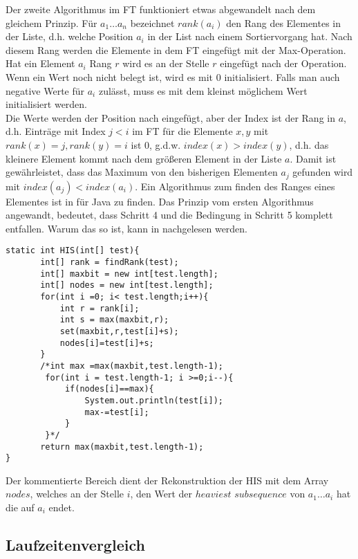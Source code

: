 Der zweite Algorithmus im FT funktioniert etwas abgewandelt nach dem gleichem Prinzip. Für $a_1\dots a_n$ bezeichnet $rank(a_i)$ den Rang des Elementes in der Liste, d.h. welche Position $a_i$ in der List nach einem Sortiervorgang hat. Nach diesem Rang werden die Elemente in dem FT eingefügt mit der Max-Operation. Hat ein Element $a_i$ Rang $r$ wird es an der Stelle $r$ eingefügt nach der Operation. Wenn ein Wert noch nicht belegt ist, wird es mit 0 initialisiert. Falls man auch negative Werte für $a_i$ zulässt, muss es mit dem kleinst möglichem Wert initialisiert werden. \\
Die Werte werden der Position nach eingefügt, aber der Index ist der Rang in $a$, d.h. Einträge mit Index $j<i$ im FT für die Elemente $x,y$ mit $rank(x)=j,rank(y)=i$ ist 0, g.d.w. $index(x)>index(y)$, d.h. das kleinere Element kommt nach dem größeren Element in der Liste $a$. Damit ist gewährleistet, dass das Maximum von den bisherigen Elementen $a_j$ gefunden wird mit $index(a_j)<index(a_i)$. Ein Algorithmus zum finden des Ranges eines Elementes ist in\cite{rank}  für Java zu finden. Das Prinzip vom ersten Algorithmus angewandt, bedeutet, dass Schritt 4 und die Bedingung in Schritt 5 komplett entfallen. Warum das so ist, kann in\cite{wordpress} nachgelesen werden.
\begin{lstlisting}
static int HIS(int[] test){
       int[] rank = findRank(test);
       int[] maxbit = new int[test.length];
       int[] nodes = new int[test.length];
       for(int i =0; i< test.length;i++){
           int r = rank[i];
           int s = max(maxbit,r);
           set(maxbit,r,test[i]+s);
           nodes[i]=test[i]+s;
       }
       /*int max =max(maxbit,test.length-1);
        for(int i = test.length-1; i >=0;i--){
            if(nodes[i]==max){
                System.out.println(test[i]);
                max-=test[i];
            }
        }*/
       return max(maxbit,test.length-1);
}
\end{lstlisting}
Der kommentierte Bereich dient der Rekonstruktion der HIS mit dem Array $nodes$, welches an der Stelle $i$, den Wert der $heaviest$ $subsequence$ von $a_1 \dots a_i$ hat die auf $a_i$ endet. 



\subsection{Laufzeitenvergleich}